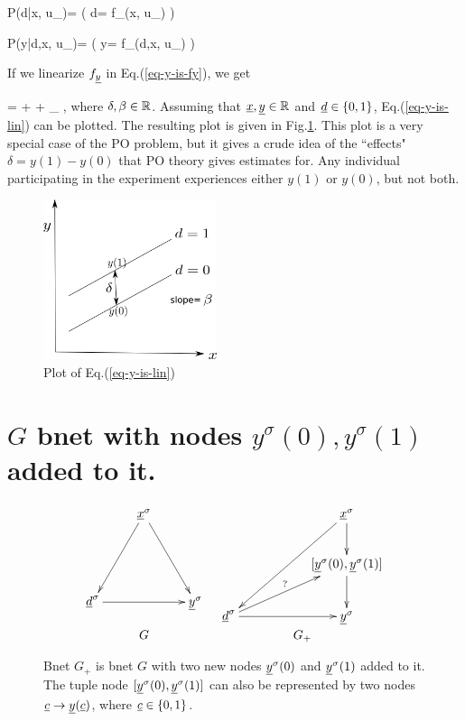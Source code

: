 \beq\color{blue}
P(d|x, u_\rvd)=
\indi( \;\; d= f_\rvd(x, u_\rvd)
\;\;)
\eeq

\beq\color{blue}
P(y|d,x, u_\rvy)=
\indi( \;\; y= f_\rvy(d,x, u_\rvy)
\;\;)
\label{eq-y-is-fy}
\eeq

If we linearize
 $f_{\underline{y}}$ in Eq.(\ref{eq-y-is-fy}),
we get

\beqa
\rvy =
\delta \rvd + \beta \rvx + \rvu_\rvy
\;,
\label{eq-y-is-lin}
\eeqa
where $\delta, \beta\in { \mathbb{R}}$.
Assuming
that ${\underline{x}}, {\underline{y}}\in { \mathbb{R}}$
and ${\underline{d}}\in \{0,1\}$,
Eq.(\ref{eq-y-is-lin}) can be plotted.
The resulting plot
is given in Fig.\ref{fig-po-two-parallel-lines}.
This plot
is a very special
case of the PO problem,
but it gives a crude idea
of the ``effects" $\delta
= y(1)-y(0)$ that PO theory 
gives estimates for.
Any 
individual participating in the experiment
experiences either $y(1)$
or $y(0)$,
but not both.



\begin{figure}[h!]
\centering
\includegraphics[width=2in]
{pot-out/two-parallel-lines.png}
\caption{Plot  of
Eq.(\ref{eq-y-is-lin})} 
\label{fig-po-two-parallel-lines}
\end{figure}






\section{$G$ bnet
with nodes $y^\sigma(0),
y^\sigma(1)$ added to it.}


\begin{figure}[h!]
$$
\begin{array}{ccccc}
\xymatrix{
&\rvx^\s\ar[ddl]\ar[ddr]
\\
\\
\rvd^\s\ar[rr]&&\rvy^\s
}
&
\xymatrix{
&&\rvx^\s\ar[ddll]\ar[d]
\\
&&[\rvy^\s(0),\rvy^\s(1)]\ar[d]
\\
\rvd^\s\ar[urr]^?\ar[rr]
&
&\rvy^\s
}
\\
G&G_{+}
\end{array}
$$
\caption{
Bnet $G_+$ is bnet $G$
with two new nodes ${\underline{y}}^\sigma(0)$
and ${\underline{y}}^\sigma(1)$
added to it.
The tuple node $[{\underline{y}}^\sigma(0), {\underline{y}}^\sigma(1)]$
can also be represented by
two nodes ${\underline{c}}\rightarrow{\underline{y}}({\underline{c}})$,
where ${\underline{c}}\in \{0,1\}$.
} 
\label{fig-po-G-im-y0-y1}
\end{figure}



